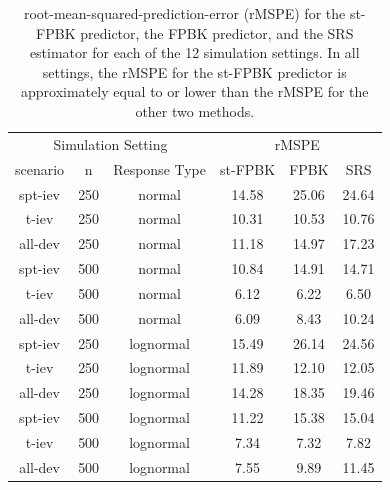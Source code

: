 \documentclass[]{interact}
\theoremstyle{plain}%
\theoremstyle{definition}
\theoremstyle{remark}
\begin{document}
\begin{table}[H]

\caption{\label{tab:simrmspetab}root-mean-squared-prediction-error (rMSPE) for the st-FPBK predictor, the FPBK predictor, and the SRS estimator for each of the 12 simulation settings. In all settings, the rMSPE for the st-FPBK predictor is approximately equal to or lower than the rMSPE for the other two methods.}
\centering
\begin{tabular}[t]{cccccc}
\toprule
\multicolumn{3}{c}{Simulation Setting} & \multicolumn{3}{c}{rMSPE} \\
\cmidrule(l{3pt}r{3pt}){1-3} \cmidrule(l{3pt}r{3pt}){4-6}
scenario & n & Response Type & st-FPBK & FPBK & SRS\\
\midrule
spt-iev & 250 & normal & 14.58 & 25.06 & 24.64\\
t-iev & 250 & normal & 10.31 & 10.53 & 10.76\\
all-dev & 250 & normal & 11.18 & 14.97 & 17.23\\
\midrule
spt-iev & 500 & normal & 10.84 & 14.91 & 14.71\\
t-iev & 500 & normal & 6.12 & 6.22 & 6.50\\
all-dev & 500 & normal & 6.09 & 8.43 & 10.24\\
\midrule
spt-iev & 250 & lognormal & 15.49 & 26.14 & 24.56\\
t-iev & 250 & lognormal & 11.89 & 12.10 & 12.05\\
all-dev & 250 & lognormal & 14.28 & 18.35 & 19.46\\
\midrule
spt-iev & 500 & lognormal & 11.22 & 15.38 & 15.04\\
t-iev & 500 & lognormal & 7.34 & 7.32 & 7.82\\
all-dev & 500 & lognormal & 7.55 & 9.89 & 11.45\\
\bottomrule
\end{tabular}
\end{table}
\end{document}
